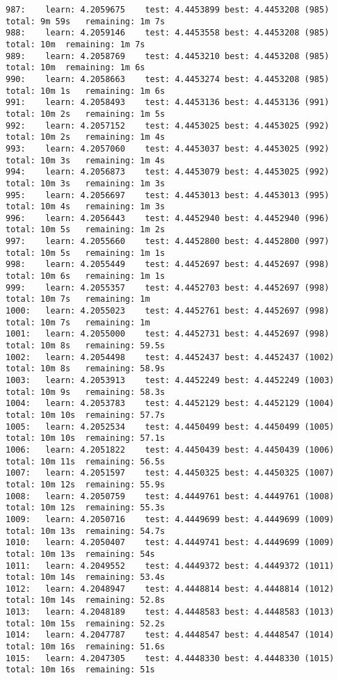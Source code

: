 \documentclass[11pt]{article}
\begin{document}
\begin{Verbatim}[commandchars=\\\{\}]
987:	learn: 4.2059675	test: 4.4453899	best: 4.4453208 (985)	total: 9m 59s	remaining: 1m 7s
988:	learn: 4.2059146	test: 4.4453558	best: 4.4453208 (985)	total: 10m	remaining: 1m 7s
989:	learn: 4.2058769	test: 4.4453210	best: 4.4453208 (985)	total: 10m	remaining: 1m 6s
990:	learn: 4.2058663	test: 4.4453274	best: 4.4453208 (985)	total: 10m 1s	remaining: 1m 6s
991:	learn: 4.2058493	test: 4.4453136	best: 4.4453136 (991)	total: 10m 2s	remaining: 1m 5s
992:	learn: 4.2057152	test: 4.4453025	best: 4.4453025 (992)	total: 10m 2s	remaining: 1m 4s
993:	learn: 4.2057060	test: 4.4453037	best: 4.4453025 (992)	total: 10m 3s	remaining: 1m 4s
994:	learn: 4.2056873	test: 4.4453079	best: 4.4453025 (992)	total: 10m 3s	remaining: 1m 3s
995:	learn: 4.2056697	test: 4.4453013	best: 4.4453013 (995)	total: 10m 4s	remaining: 1m 3s
996:	learn: 4.2056443	test: 4.4452940	best: 4.4452940 (996)	total: 10m 5s	remaining: 1m 2s
997:	learn: 4.2055660	test: 4.4452800	best: 4.4452800 (997)	total: 10m 5s	remaining: 1m 1s
998:	learn: 4.2055449	test: 4.4452697	best: 4.4452697 (998)	total: 10m 6s	remaining: 1m 1s
999:	learn: 4.2055357	test: 4.4452703	best: 4.4452697 (998)	total: 10m 7s	remaining: 1m
1000:	learn: 4.2055023	test: 4.4452761	best: 4.4452697 (998)	total: 10m 7s	remaining: 1m
1001:	learn: 4.2055000	test: 4.4452731	best: 4.4452697 (998)	total: 10m 8s	remaining: 59.5s
1002:	learn: 4.2054498	test: 4.4452437	best: 4.4452437 (1002)	total: 10m 8s	remaining: 58.9s
1003:	learn: 4.2053913	test: 4.4452249	best: 4.4452249 (1003)	total: 10m 9s	remaining: 58.3s
1004:	learn: 4.2053783	test: 4.4452129	best: 4.4452129 (1004)	total: 10m 10s	remaining: 57.7s
1005:	learn: 4.2052534	test: 4.4450499	best: 4.4450499 (1005)	total: 10m 10s	remaining: 57.1s
1006:	learn: 4.2051822	test: 4.4450439	best: 4.4450439 (1006)	total: 10m 11s	remaining: 56.5s
1007:	learn: 4.2051597	test: 4.4450325	best: 4.4450325 (1007)	total: 10m 12s	remaining: 55.9s
1008:	learn: 4.2050759	test: 4.4449761	best: 4.4449761 (1008)	total: 10m 12s	remaining: 55.3s
1009:	learn: 4.2050716	test: 4.4449699	best: 4.4449699 (1009)	total: 10m 13s	remaining: 54.7s
1010:	learn: 4.2050407	test: 4.4449741	best: 4.4449699 (1009)	total: 10m 13s	remaining: 54s
1011:	learn: 4.2049552	test: 4.4449372	best: 4.4449372 (1011)	total: 10m 14s	remaining: 53.4s
1012:	learn: 4.2048947	test: 4.4448814	best: 4.4448814 (1012)	total: 10m 14s	remaining: 52.8s
1013:	learn: 4.2048189	test: 4.4448583	best: 4.4448583 (1013)	total: 10m 15s	remaining: 52.2s
1014:	learn: 4.2047787	test: 4.4448547	best: 4.4448547 (1014)	total: 10m 16s	remaining: 51.6s
1015:	learn: 4.2047305	test: 4.4448330	best: 4.4448330 (1015)	total: 10m 16s	remaining: 51s

\end{Verbatim}
\end{document}
